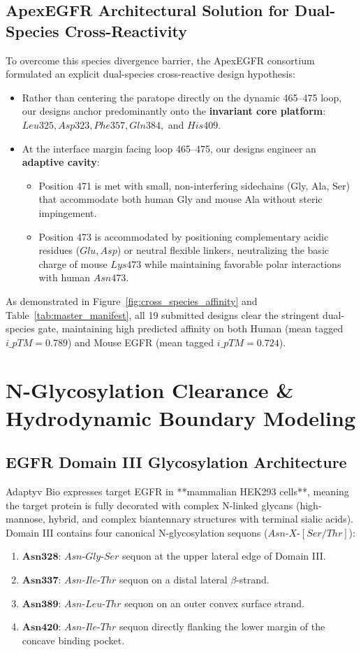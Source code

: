 \documentclass[11pt]{article}
\begin{document}
\subsection{ApexEGFR Architectural Solution for Dual-Species Cross-Reactivity}
To overcome this species divergence barrier, the ApexEGFR consortium formulated an explicit dual-species cross-reactive design hypothesis:
\begin{itemize}
    \item Rather than centering the paratope directly on the dynamic 465--475 loop, our designs anchor predominantly onto the \textbf{invariant core platform}: $Leu325, Asp323, Phe357, Gln384,$ and $His409$.
    \item At the interface margin facing loop 465--475, our designs engineer an \textbf{adaptive cavity}:
    \begin{itemize}
        \item Position 471 is met with small, non-interfering sidechains (Gly, Ala, Ser) that accommodate both human Gly and mouse Ala without steric impingement.
        \item Position 473 is accommodated by positioning complementary acidic residues ($Glu, Asp$) or neutral flexible linkers, neutralizing the basic charge of mouse $Lys473$ while maintaining favorable polar interactions with human $Asn473$.
    \end{itemize}
\end{itemize}
As demonstrated in Figure~\ref{fig:cross_species_affinity} and Table~\ref{tab:master_manifest}, all 19 submitted designs clear the stringent dual-species gate, maintaining high predicted affinity on both Human (mean tagged $i\_pTM = 0.789$) and Mouse EGFR (mean tagged $i\_pTM = 0.724$).

\section{N-Glycosylation Clearance \& Hydrodynamic Boundary Modeling}

\subsection{EGFR Domain III Glycosylation Architecture}
Adaptyv Bio expresses target EGFR in **mammalian HEK293 cells**, meaning the target protein is fully decorated with complex N-linked glycans (high-mannose, hybrid, and complex biantennary structures with terminal sialic acids). Domain III contains four canonical N-glycosylation sequons ($Asn\text{-}X\text{-}[Ser/Thr]$):
\begin{enumerate}
    \item $\mathbf{Asn328}$: $Asn\text{-}Gly\text{-}Ser$ sequon at the upper lateral edge of Domain III.
    \item $\mathbf{Asn337}$: $Asn\text{-}Ile\text{-}Thr$ sequon on a distal lateral $\beta$-strand.
    \item $\mathbf{Asn389}$: $Asn\text{-}Leu\text{-}Thr$ sequon on an outer convex surface strand.
    \item $\mathbf{Asn420}$: $Asn\text{-}Ile\text{-}Thr$ sequon directly flanking the lower margin of the concave binding pocket.
\end{enumerate}
\end{document}
